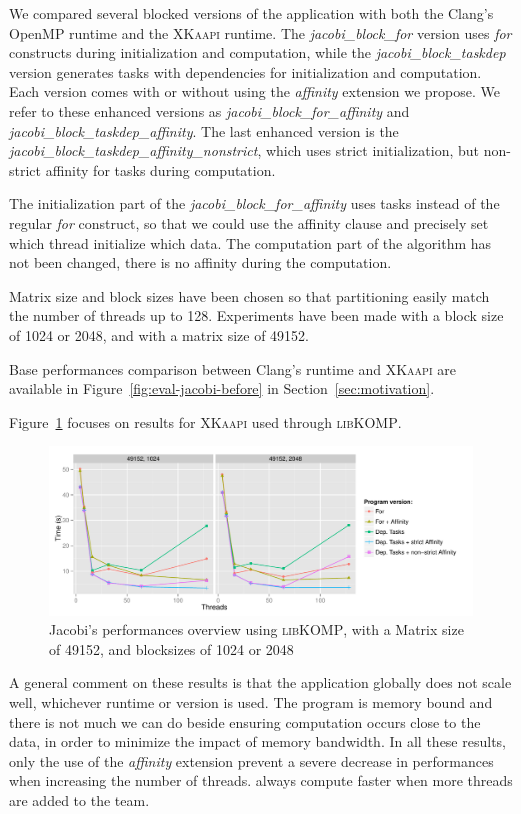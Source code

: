 \documentclass{Styles/llncs}
\newcommand{\kaapi}{\textsc{\mbox{XKaapi}}\xspace}
\newcommand{\libXKOMP}{\textsc{libKOMP}\xspace}
\begin{document}
We compared several blocked versions of the application with both the Clang's OpenMP runtime
and the \kaapi runtime. The \textit{jacobi\_block\_for} version uses \emph{for} constructs during initialization and computation, while the \textit{jacobi\_block\_taskdep} version generates tasks with dependencies for initialization and computation. Each version comes with or without using the \emph{affinity} extension we propose. We refer to these enhanced versions as \textit{jacobi\_block\_for\_affinity} and \textit{jacobi\_block\_taskdep\_affinity}. The last enhanced version is the
\textit{jacobi\_block\_taskdep\_affinity\_nonstrict}, which uses strict initialization, but non-strict affinity for tasks during computation.

The initialization part of the \textit{jacobi\_block\_for\_affinity} uses tasks
instead of the regular \emph{for} construct, so that we could use the affinity clause and precisely
set which thread initialize which data.
The computation part of the algorithm has not been changed, there is no affinity
during the computation.

Matrix size and block sizes have been chosen so that partitioning easily match
the number of threads up to 128. Experiments have been made with a block size of 1024
or 2048, and with a matrix size of 49152.

Base performances comparison between Clang's runtime and \kaapi are available in Figure~\ref{fig:eval-jacobi-before} in Section~\ref{sec:motivation}.

Figure~\ref{fig:eval-jacobi} focuses on results for \kaapi used through \libXKOMP.

\begin{figure}[t]
  \centering
  \includegraphics[scale=0.6]{graphs/jacobi_scale.pdf}
  \caption{Jacobi's performances overview using \libXKOMP, with a Matrix size of 49152, and blocksizes of 1024 or 2048}
\label{fig:eval-jacobi}
\end{figure}

A general comment on these results is that the application globally does not scale well, whichever runtime or version is used.
The program is memory bound and there is not much we can do beside ensuring computation occurs
close to the data, in order to minimize the impact of memory bandwidth.
In all these results, only the use of the \emph{affinity} extension prevent
a severe decrease in performances when increasing the number of threads.
always compute faster when more threads are added to the team.
\end{document}
